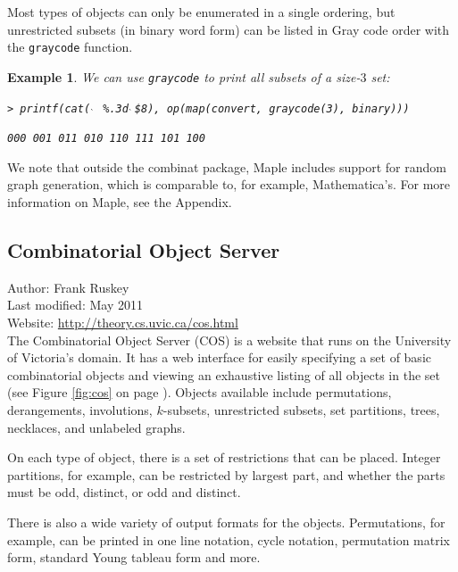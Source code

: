 \documentclass[12pt]{article}
\theoremstyle{plain}
\newtheorem{exa}{Example}
\newcommand{\codefont}[1]{{\fontshape{n}\texttt{#1}}}
\newcommand{\backtick}{$\hspace{4pt}\grave{ }\hspace{2pt}$}
\newenvironment{snippet}{\vspace{10px}\fontfamily{ppl}\selectfont}{\vspace{10px}}
\begin{document}
Most types of objects can only be enumerated in a single ordering, but unrestricted subsets (in binary word form) can be listed in Gray code order with the
\codefont{graycode}
function.
\begin{exa}
We can use \codefont{graycode} to print all subsets of a size-\(3\) set:

\begin{snippet}
\codefont{> printf(cat(\backtick \ \%.3d\backtick \$8), op(map(convert, graycode(3), binary)))}

\codefont{000 001 011 010 110 111 101 100}
\end{snippet}
\end{exa}

We note that outside the combinat package, Maple includes support for random graph generation, which is comparable to, for example, Mathematica's.
For more information on Maple, see the Appendix.


\subsection{Combinatorial Object Server}

Author: Frank Ruskey
\\
Last modified: May 2011
\\
Website: \url{http://theory.cs.uvic.ca/cos.html}
\\

The Combinatorial Object Server (COS) is a website that runs on the University of Victoria's domain.
It has a web interface for easily specifying a set of basic combinatorial objects and viewing an exhaustive listing of all objects in the set (see Figure \ref{fig:cos} on page \pageref{fig:cos}).
Objects available include permutations, derangements, involutions, \(k\)-subsets, unrestricted subsets, set partitions, trees, necklaces, and unlabeled graphs.

On each type of object, there is a set of restrictions that can be placed.
Integer partitions, for example, can be restricted by largest part, and whether the parts must be
odd,
distinct, or odd and distinct.


There is also a wide variety of output formats for the objects.
Permutations, for example, can be printed in one line notation, cycle notation, permutation matrix form, standard Young tableau form and more.
\end{document}
